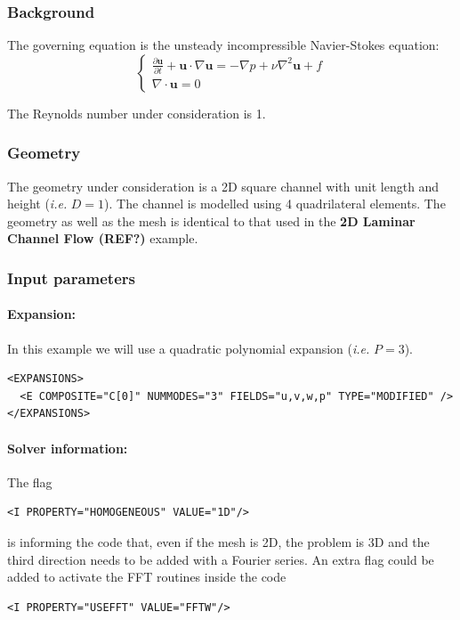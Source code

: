 \subsubsection{Background}
The governing equation is the unsteady incompressible Navier-Stokes equation:
\begin{equation}
\begin{cases}
\frac{\partial \textbf{u}}{\partial t} + \textbf{u} \cdot \nabla \textbf{u} = - \nabla p + \nu \nabla^2 \textbf{u} + f \\
\nabla \cdot \textbf{u} = 0
\end{cases}
\end{equation}

The Reynolds number under consideration is 1.

\subsubsection{Geometry}
The geometry under consideration is a 2D square channel with unit length and height (\textit{i.e.} $D=1$). The channel is modelled using 4 quadrilateral elements. The geometry as well as the mesh is identical to that used in the \textbf{2D Laminar Channel Flow (REF?)} example.

\subsubsection{Input parameters}
\paragraph{Expansion:~} In this example we will use a quadratic polynomial expansion (\textit{i.e.} $P=3$).
\begin{lstlisting}[style=XMLStyle]
<EXPANSIONS>
  <E COMPOSITE="C[0]" NUMMODES="3" FIELDS="u,v,w,p" TYPE="MODIFIED" />
</EXPANSIONS>
\end{lstlisting}

\paragraph{Solver information:~}  The flag 
\begin{lstlisting}[style=XMLStyle] 
<I PROPERTY="HOMOGENEOUS" VALUE="1D"/> 
\end{lstlisting} 
is informing the code that, even if the mesh is 2D, the problem is 3D and the third direction needs to be added with a Fourier series. An extra flag could be added to activate the FFT routines inside the code 
\begin{lstlisting}[style=XMLStyle]
<I PROPERTY="USEFFT" VALUE="FFTW"/>
\end{lstlisting} 

